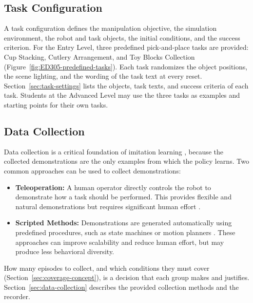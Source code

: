 \documentclass[11pt]{article}
\begin{document}
\subsection{Task Configuration}
\label{sec:task-config}
A task configuration defines the manipulation objective, the simulation environment, the robot and task objects, the initial conditions, and the success criterion. For the Entry Level, three predefined pick-and-place tasks are provided: Cup Stacking, Cutlery Arrangement, and Toy Blocks Collection (Figure~\ref{fig:ED305-predefined-tasks}). Each task randomizes the object positions, the scene lighting, and the wording of the task text at every reset. Section~\ref{sec:task-settings} lists the objects, task texts, and success criteria of each task. Students at the Advanced Level may use the three tasks as examples and starting points for their own tasks.


\subsection{Data Collection}
\label{sec:data-collection-concept}

Data collection is a critical foundation of imitation learning \cite{wiki_imitation_learning}, because the collected 
demonstrations are the only examples from which the policy learns. Two common approaches can be used to collect demonstrations:

\begin{itemize}
\item \textbf{Teleoperation:} A human operator directly controls the robot to demonstrate how a task should be performed.
      This provides flexible and natural demonstrations but requires significant human effort \cite{wikipediaTeleoperation}.
\item \textbf{Scripted Methods:} Demonstrations are generated automatically using predefined procedures,
      such as state machines \cite{mdnStateMachine} or motion planners \cite{wikipediaMotionPlanning}. These approaches can
      improve scalability and reduce human effort, but may produce less behavioral diversity.
\end{itemize}

How many episodes to collect, and which conditions they must cover (Section~\ref{sec:coverage-concept}), is a decision that each group makes and justifies. Section~\ref{sec:data-collection} describes the provided collection methods and the recorder.
\end{document}
